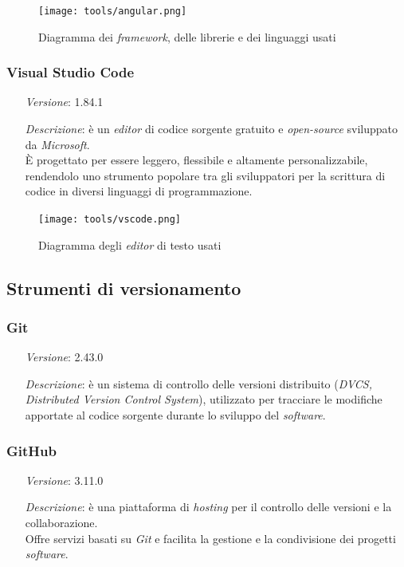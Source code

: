     \begin{figure}[H]
      \centering
      \texttt{[image: tools/angular.png]}
      \caption{Diagramma dei \textit{framework}, delle librerie e dei linguaggi usati}
    \end{figure}

    \subsubsection*{Visual Studio Code} %
    \begin{itemize}[align=left]
        \item [\textit{Versione}:] 1.84.1
        \item [\textit{Descrizione}:] è un \textit{editor} di codice sorgente gratuito e \textit{open-source} sviluppato da \textit{Microsoft}. \\
                È progettato per essere leggero, flessibile e altamente personalizzabile, rendendolo uno strumento popolare tra gli sviluppatori per la scrittura di codice in diversi linguaggi di programmazione.
    \end{itemize}
    \begin{figure}[H]
      \centering
      \texttt{[image: tools/vscode.png]}
      \caption{Diagramma degli \textit{editor} di testo usati}
    \end{figure}


\subsection{Strumenti di versionamento}
    \subsubsection*{Git}
    \begin{itemize}[align=left]
        \item [\textit{Versione}:] 2.43.0
        \item [\textit{Descrizione}:] è un sistema di controllo delle versioni distribuito (\textit{DVCS, Distributed Version Control System}), utilizzato per tracciare le modifiche apportate al codice sorgente durante lo sviluppo del \textit{software}.
    \end{itemize}

    \subsubsection*{GitHub} %
    \begin{itemize}[align=left]
        \item [\textit{Versione}:] 3.11.0
        \item [\textit{Descrizione}:] è una piattaforma di \textit{hosting} per il controllo delle versioni e la collaborazione. \\
                    Offre servizi basati su \textit{Git} e facilita la gestione e la condivisione dei progetti \textit{software}.
    \end{itemize}

